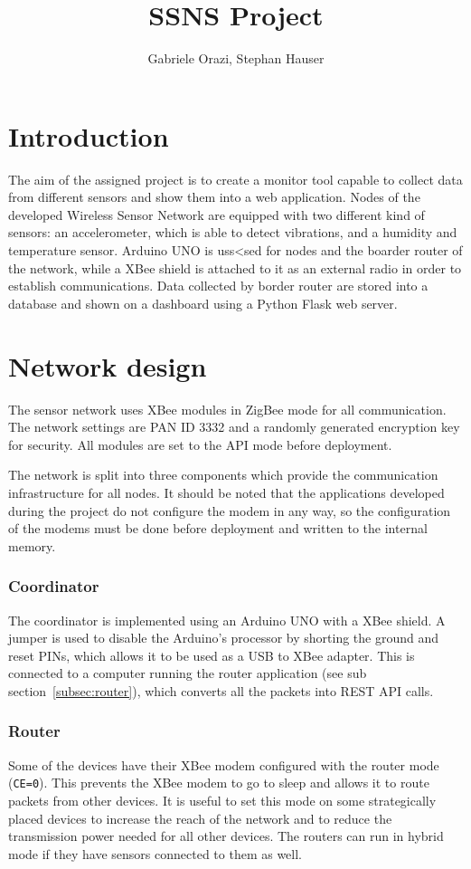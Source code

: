 \documentclass[a4paper,11pt]{scrartcl}
\title{SSNS Project}
\author{Gabriele Orazi, Stephan Hauser}
\begin{document}
\maketitle

\part{Introduction}
The aim of the assigned project is to create a monitor tool capable to collect data from different sensors and show them into a web application.
Nodes of the developed Wireless Sensor Network are equipped with two different kind of sensors: an accelerometer, which is able to detect vibrations, and a humidity and temperature sensor.
Arduino UNO is uss<sed for nodes and the boarder router of the network, while a XBee shield is attached to it as an external radio in order to establish communications.
Data collected by border router are stored into a database and shown on a dashboard using a Python Flask web server.

\part{Network design}
The sensor network uses XBee modules in ZigBee mode for all communication. The network settings are PAN ID 3332 and a randomly generated encryption key for security. All modules are set to the API mode before deployment.

The network is split into three components which provide the communication infrastructure for all nodes. It should be noted that the applications developed during the project do not configure the modem in any way, so the configuration of the modems must be done before deployment and written to the internal memory.

\section{Coordinator}\label{sec:coordinator}
The coordinator is implemented using an Arduino UNO with a XBee shield. A jumper is used to disable the Arduino's processor by shorting the ground and reset PINs, which allows it to be used as a USB to XBee adapter. This is connected to a computer running the router application (see sub section~\ref{subsec:router}), which converts all the packets into REST API calls.

\section{Router}
Some of the devices have their XBee modem configured with the router mode (\texttt{CE=0}). This prevents the XBee modem to go to sleep and allows it to route packets from other devices. It is useful to set this mode on some strategically placed devices to increase the reach of the network and to reduce the transmission power needed for all other devices. The routers can run in hybrid mode if they have sensors connected to them as well.
\end{document}
